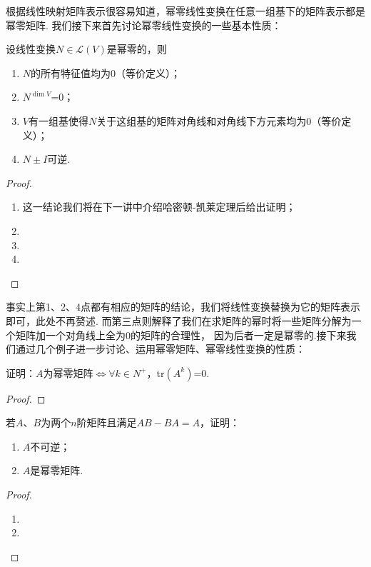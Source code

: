 根据线性映射矩阵表示很容易知道，幂零线性变换在任意一组基下的矩阵表示都是幂零矩阵.
我们接下来首先讨论幂零线性变换的一些基本性质：
\begin{theorem} \label{thm:20:幂零线性变换性质}
    设线性变换$N\in \mathcal{L}(V)$是幂零的，则
    \begin{enumerate}[label=(\arabic*)]
        \item $N$的所有特征值均为0（等价定义）；

        \item $N^{\dim V}$=0；

        \item $V$有一组基使得$N$关于这组基的矩阵对角线和对角线下方元素均为0（等价定义）；

        \item $N\pm I$可逆.
    \end{enumerate}
\end{theorem}
\begin{proof}
    \begin{enumerate}[label=(\arabic*)]
        \item 这一结论我们将在下一讲中介绍哈密顿-凯莱定理后给出证明；
        \item 
        \item 
        \item 
    \end{enumerate}
\end{proof}

事实上第1、2、4点都有相应的矩阵的结论，我们将线性变换替换为它的矩阵表示即可，此处不再赘述.
而第三点则解释了我们在求矩阵的幂时将一些矩阵分解为一个矩阵加一个对角线上全为0的矩阵的合理性，
因为后者一定是幂零的.接下来我们通过几个例子进一步讨论、运用幂零矩阵、幂零线性变换的性质：
\begin{example}
    证明：$A$为幂零矩阵$\iff \forall k \in N^+$，\textup{tr}$(A^k)$=\textup{0}.
\end{example}
\begin{proof}

\end{proof}

\begin{example}
	若$A$、$B$为两个$n$阶矩阵且满足$AB-BA=A$，证明：
    \begin{enumerate}[label=(\arabic*)]
        \item $A$不可逆；
        \item $A$是幂零矩阵.
    \end{enumerate}
\end{example}
\begin{proof}
    \begin{enumerate}[label=(\arabic*)]
        \item 
        \item 
    \end{enumerate}
\end{proof}

